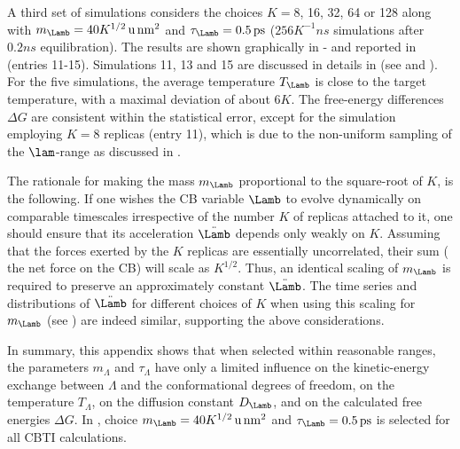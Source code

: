 A third set of simulations considers the choices $K=$8, 16, 32, 64 or 128
along with 
$m_{\Lamb}=40 K^{1/2}\,\mathrm{u}\,\mathrm{nm}^2$
and $\tau_{\Lamb}=0.5\,\mathrm{ps}$ 
($256 K^{-1}\unit{ns}$ simulations after $0.2\unit{ns}$ equilibration). 
%
The results are shown graphically in  -  and reported in  (entries 11-15).
%
Simulations 11, 13 and 15 are discussed in details in  (see  and ).
%
For the five simulations, the average temperature $T_{\Lamb}$ is close to the target temperature,
with a maximal deviation of about $6\unit{K}$.
%
The free-energy differences $\Delta G$ are consistent within
the statistical error, except for the simulation employing $K=8$ replicas (entry 11),
which is due to the non-uniform sampling of the $\lam$-range as discussed in .
%

The rationale for making the mass $m_{\Lamb}$ proportional to the square-root of $K$,  is the following. 
If one wishes the CB variable $\Lamb$ to evolve dynamically on comparable timescales irrespective of the number $K$ of replicas attached to it, one should ensure that its acceleration $\ddot{\Lamb}$
depends only weakly on $K$. Assuming that the forces exerted by the $K$ replicas are essentially uncorrelated, their sum (\ie{} the net force on the CB) will scale as $K^{1/2}$. 
Thus, an identical scaling of $m_{\Lamb}$ is required to preserve an approximately constant $\ddot{\Lamb}$. The time series and distributions of $\ddot{\Lamb}$ for different choices of $K$ when using this scaling for $m_{\Lamb}$ (see ) are indeed similar, 
supporting the above considerations.

In summary, this appendix shows that when selected within reasonable ranges,
the parameters $m_\Lambda$ and $\tau_\Lambda$ have only a limited 
influence on the kinetic-energy exchange between $\Lambda$ and the conformational
degrees of freedom, on the temperature $T_\Lambda$, on the diffusion constant $D_\Lamb$, 
and on the calculated free energies $\Delta G$.
%
In ,  choice
$m_{\Lamb}=40 K^{1/2}\,\mathrm{u}\,\mathrm{nm}^2$ 
and $\tau_{\Lamb}=0.5\,\mathrm{ps}$ 
is selected for all CBTI calculations.






